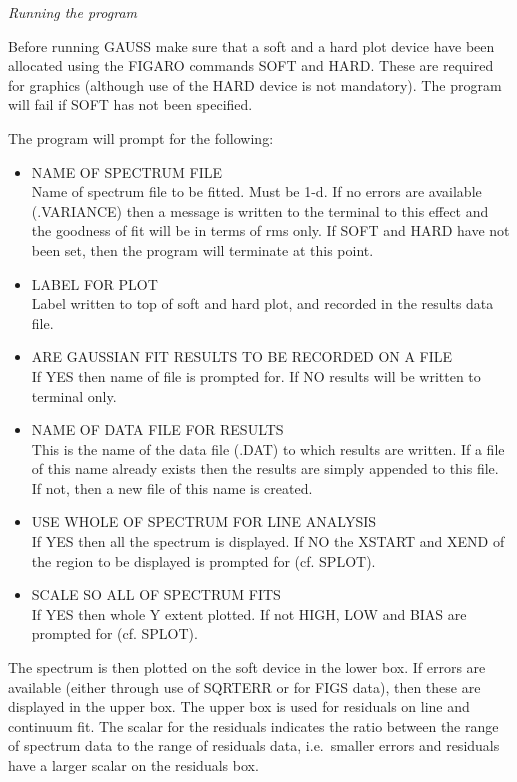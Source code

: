 \goodbreak
\vspace{12pt}
{\it Running the program}

Before running GAUSS make sure that a soft and a hard plot device have been
allocated using the FIGARO commands SOFT and HARD. These are required for 
graphics (although use of the HARD device is not mandatory). The program 
will fail if SOFT has not been specified.

The program will prompt for the following:

\begin{itemize}
\item NAME OF SPECTRUM FILE\\
   Name of spectrum file to be fitted. Must be 1-d. If 
   no errors are available
   (.VARIANCE) then a message is written to the terminal to this effect and
   the goodness of fit will be in terms of rms only.
   If SOFT and HARD have not been set, then the program will terminate at this 
   point.
\item LABEL FOR PLOT\\
   Label written to top of soft and hard plot, and recorded in the 
   results data file.
\item ARE GAUSSIAN FIT RESULTS TO BE RECORDED ON A FILE\\
   If YES then name of file is prompted for. If NO results will be 
   written to terminal only.
\item NAME OF DATA FILE FOR RESULTS\\
   This is the name of the data file (.DAT) to 
   which results are written. If a file of this name already exists then 
   the results are simply appended to 
   this file. If not, then a new file of this name is created.
\item USE WHOLE OF SPECTRUM FOR LINE ANALYSIS\\
   If YES then all the spectrum is displayed. If NO the 
   XSTART and XEND of the
   region to be displayed is prompted for (cf. SPLOT).
\item SCALE SO ALL OF SPECTRUM FITS\\
   If YES then whole Y extent plotted. If not HIGH, LOW 
   and BIAS are prompted for (cf. SPLOT).
\end{itemize}

The spectrum is then plotted on the soft device in the lower box. If
errors are available (either through use of SQRTERR or for FIGS data),
then these are displayed in the upper box. The upper box is used for
residuals on line and continuum fit. The scalar for the residuals
indicates the ratio between the range of spectrum data to the range of
residuals data, i.e.\ smaller errors and residuals have a larger scalar
on the residuals box.

